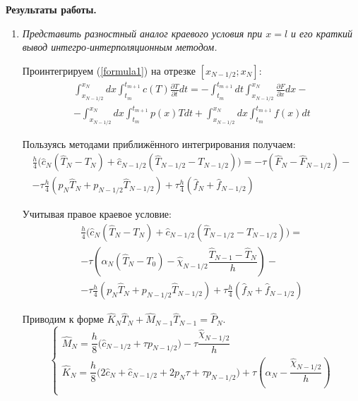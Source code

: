 \textbf{Результаты работы.}
\begin{enumerate}
	\item \textit{Представить разностный аналог краевого условия при $x = l$
	и его краткий вывод интегро-интерполяционным методом.}  
	
	Проинтегрируем (\ref{formula1}) на отрезке $[x_{N-1/2}; x_{N}]$:
	\begin{align*}
		\int_{x_{N-1/2}}^{x_{N}} dx \int_{t_m}^{t_{m+1}} c(T) \frac{\partial T}{\partial t} dt 
		=	
		- \int_{t_m}^{t_{m+1}} dt \int_{x_{N-1/2}}^{x_{N}} \frac{\partial F}{\partial x} dx 	 
		- \\ -
		\int_{x_{N-1/2}}^{x_{N}} dx \int_{t_m}^{t_{m+1}} p(x)T dt 
		+
		\int_{x_{N-1/2}}^{x_{N}} dx \int_{t_m}^{t_{m+1}} f(x)dt
	\end{align*}
	
	Пользуясь методами приближённого интегрирования получаем:
	\begin{align*}
		\frac{h}{4}\big(\hat{c}_N (\hat{T}_N - T_N) + \hat{c}_{N-1/2} (\hat{T}_{N-1/2} - T_{N-1/2})\big)
		=
		- \tau(\hat{F}_{N} - \hat{F}_{N-1/2})
		- \\ -
		\tau \frac{h}{4}(p_{N}\hat{T}_{N} + p_{N-1/2}\hat{T}_{N-1/2})
		+
		\tau \frac{h}{4}(\hat{f}_{N} + \hat{f}_{N-1/2})
	\end{align*}
	
	Учитывая правое краевое условие:
	\begin{multline*}
		\frac{h}{4}\big(\hat{c}_N (\hat{T}_N - T_N) + \hat{c}_{N-1/2} (\hat{T}_{N-1/2} - T_{N-1/2})\big)
		= \\
		- \tau(\alpha_N(\hat{T}_N - T_0) - \hat{\chi}_{N-1/2} \dfrac{\hat{T}_{N-1} - \hat{T}_{N}}{h})
		- \\ -
		\tau \frac{h}{4} (p_{N}\hat{T}_{N} + p_{N-1/2}\hat{T}_{N-1/2})
		+
		\tau \frac{h}{4} (\hat{f}_{N} + \hat{f}_{N-1/2})
	\end{multline*}
	
	
	Приводим к форме $\hat{K}_N \hat{T}_{N} + \hat{M}_{N-1} \hat{T}_{N-1} = \hat{P}_N$.
	\begin{equation*}
		\begin{cases}
			\hat{M}_N = \dfrac{h}{8}\big(\hat{c}_{N-1/2} + \tau p_{N-1/2}\big) - \tau\dfrac{\hat{\chi}_{N-1/2}}{h} \\
				
			\hat{K}_N = \dfrac{h}{8}\big(2\hat{c}_N + \hat{c}_{N-1/2} + 2p_N\tau + \tau p_{N-1/2}\big) + \tau(\alpha_N - \dfrac{\hat{\chi}_{N-1/2}}{h}) \\
		 

\end{cases}
\end{equation*}
\end{enumerate}
